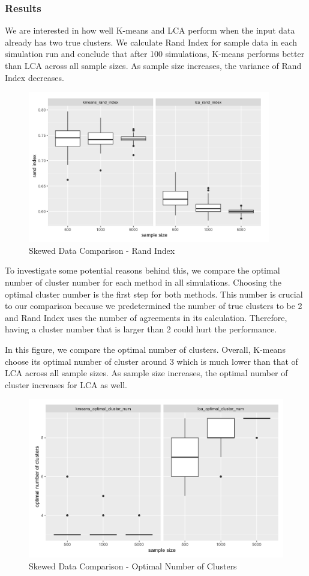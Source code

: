 \documentclass[
]{article}
\begin{document}
\hypertarget{results}{%
\subsubsection{Results}\label{results}}

We are interested in how well K-means and LCA perform when the input
data already has two true clusters. We calculate Rand Index for sample
data in each simulation run and conclude that after 100 simulations,
K-means performs better than LCA across all sample sizes. As sample size
increases, the variance of Rand Index decreases.

\begin{figure}
\centering
\includegraphics[width=4.16667in,height=\textheight]{report_image/skewed_data_rand_index_results.png}
\caption{Skewed Data Comparison - Rand Index}
\end{figure}

To investigate some potential reasons behind this, we compare the
optimal number of cluster number for each method in all simulations.
Choosing the optimal cluster number is the first step for both methods.
This number is crucial to our comparison because we predetermined the
number of true clusters to be 2 and Rand Index uses the number of
agreements in its calculation. Therefore, having a cluster number that
is larger than 2 could hurt the performance.

In this figure, we compare the optimal number of clusters. Overall,
K-means choose its optimal number of cluster around 3 which is much
lower than that of LCA across all sample sizes. As sample size
increases, the optimal number of cluster increases for LCA as well.

\begin{figure}

{\centering \includegraphics[width=0.5\linewidth]{report_image/skewed_data_num_clusters_results} 

}

\caption{Skewed Data Comparison - Optimal Number of Clusters}\label{fig:unnamed-chunk-1}
\end{figure}
\end{document}
